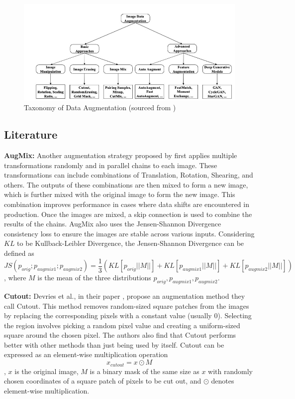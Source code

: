 \documentclass[a4paper,11pt,openright]{book}
\begin{document}
\begin{figure}[!htb]
    \centering
    \includegraphics[width=.9\textwidth]{images/data_aug_categories.png}
    \caption{Taxonomy of Data Augmentation (sourced from \cite{yangImageDataAugmentation2022})}
    \label{fig:categorization_augmentation}
\end{figure}

\subsection{Literature}
\textbf{AugMix: }
Another augmentation strategy proposed by \cite{hendrycksAugMixSimpleData2020} first applies multiple transformations randomly and in parallel chains to each image. These transformations can include combinations of Translation, Rotation, Shearing, and others. The outputs of these combinations are then mixed to form a new image, which is further mixed with the original image to form the new image. This combination improves performance in cases where data shifts are encountered in production. Once the images are mixed, a skip connection is used to combine the results of the chains. AugMix also uses the Jensen-Shannon Divergence consistency loss \cite{linDivergenceMeasuresBased} to ensure the images are stable across various inputs. Considering $KL$ to be Kullback-Leibler Divergence, the Jensen-Shannon Divergence can be defined as $$
    JS(p_{orig}; p_{augmix1};p_{augmix2}) = \frac{1}{3}(KL[p_{orig}||M||]+KL[p_{augmix1}||M||]+KL[p_{augmix2}||M||])
$$, where $M$ is the mean of the three distributions $p_{orig}, p_{augmix1}, p_{augmix2}$.

\textbf{Cutout: }
Devries et al., in their paper \cite{devriesImprovedRegularizationConvolutional2017}, propose an augmentation method they call Cutout. This method removes random-sized square patches from the images by replacing the corresponding pixels with a constant value (usually 0). Selecting the region involves picking a random pixel value and creating a uniform-sized square around the chosen pixel. The authors also find that Cutout performs better with other methods than just being used by itself. Cutout can be expressed as an element-wise multiplication operation $$x_{cutout} = x \odot M$$,
$x$ is the original image, $M$ is a binary mask of the same size as $x$ with randomly chosen coordinates of a square patch of pixels to be cut out, and $\odot$ denotes element-wise multiplication.
\end{document}
